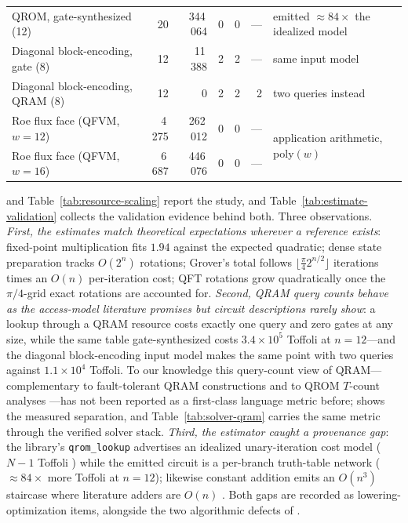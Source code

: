 \begin{table}[t]
\begin{tabular}{@{}p{3.9cm}rrrrrp{4.6cm}@{}}
    QROM, gate-synthesized (12) & 20 & 344\,064 & 0 & 0 & --- & emitted $\approx 84\times$ the idealized model \\
    Diagonal block-encoding, gate (8) & 12 & 11\,388 & 2 & 2 & --- & same input model \\
    Diagonal block-encoding, QRAM (8) & 12 & 0 & 2 & 2 & 2 & two queries instead \\
    Roe flux face (QFVM, $w{=}12$) & 4\,275 & 262\,012 & 0 & 0 & --- & \multirow{2}{4.6cm}{application arithmetic, poly$(w)$} \\
    Roe flux face (QFVM, $w{=}16$) & 6\,687 & 446\,076 & 0 & 0 & --- & \\
    \bottomrule
  \end{tabular}
\end{table}

 and Table~\ref{tab:resource-scaling} report
the study, and Table~\ref{tab:estimate-validation} collects the validation
evidence behind both.  Three observations.
\emph{First, the estimates match theoretical expectations wherever a
reference exists}: fixed-point multiplication fits $1.94$ against the
expected quadratic; dense state preparation tracks $O(2^n)$ rotations;
Grover's total follows $\lfloor \frac{\pi}{4} 2^{n/2} \rfloor$ iterations
times an $O(n)$ per-iteration cost; QFT rotations grow quadratically once
the $\pi/4$-grid exact rotations are accounted for.  \emph{Second, QRAM
query counts behave as the access-model literature promises but circuit
descriptions rarely show}: a lookup through a QRAM resource costs exactly
one query and zero gates at any size, while the same table gate-synthesized
costs $3.4{\times}10^5$ Toffoli at $n=12$---and the diagonal block-encoding
input model makes the same point with two queries against
$1.1{\times}10^4$ Toffoli.  To our knowledge this query-count view of
QRAM---complementary to fault-tolerant QRAM constructions
\cite{dalzell2025qram} and to QROM $T$-count analyses
\cite{babbush2018encoding,low2024trading}---has not been reported as a
first-class language metric before;  shows the
measured separation, and Table~\ref{tab:solver-qram} carries the same
metric through the verified solver stack.  \emph{Third, the estimator caught a
provenance gap}: the library's \texttt{qrom\_lookup} advertises an
idealized unary-iteration cost model ($N{-}1$ Toffoli
\cite{babbush2018encoding}) while the emitted circuit is a per-branch
truth-table network ($\approx 84\times$ more Toffoli at $n=12$); likewise
constant addition emits an $O(n^3)$ staircase where literature adders are
$O(n)$ \cite{gidney2018halving}.  Both gaps are recorded as
lowering-optimization items, alongside the two algorithmic defects of
.

